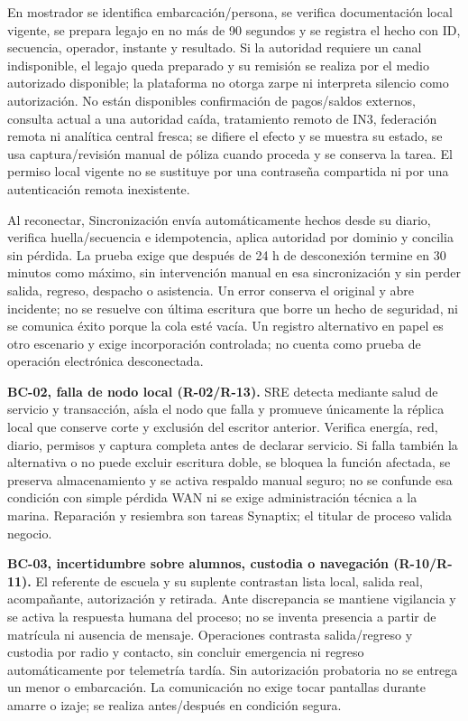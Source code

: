 En mostrador se identifica embarcación/persona, se verifica documentación local vigente, se prepara legajo en no más de 90 segundos y se registra el hecho con ID, secuencia, operador, instante y resultado. Si la autoridad requiere un canal indisponible, el legajo queda preparado y su remisión se realiza por el medio autorizado disponible; la plataforma no otorga zarpe ni interpreta silencio como autorización. No están disponibles confirmación de pagos/saldos externos, consulta actual a una autoridad caída, tratamiento remoto de IN3, federación remota ni analítica central fresca; se difiere el efecto y se muestra su estado, se usa captura/revisión manual de póliza cuando proceda y se conserva la tarea. El permiso local vigente no se sustituye por una contraseña compartida ni por una autenticación remota inexistente. \parencites[cap.~15, autonomía RT-03.10 y sincronización RT-03.13, p.~33; RT-09.01, p.~34; numeral~16.1, decisión~21, p.~38]{sd8-c07}[cap.~3, funciones no disponibles RT-03.13, p.~9]{sd8-bt}

Al reconectar, Sincronización envía automáticamente hechos desde su diario, verifica huella/secuencia e idempotencia, aplica autoridad por dominio y concilia sin pérdida. La prueba exige que después de 24 h de desconexión termine en 30 minutos como máximo, sin intervención manual en esa sincronización y sin perder salida, regreso, despacho o asistencia. Un error conserva el original y abre incidente; no se resuelve con última escritura que borre un hecho de seguridad, ni se comunica éxito porque la cola esté vacía. Un registro alternativo en papel es otro escenario y exige incorporación controlada; no cuenta como prueba de operación electrónica desconectada.

\textbf{BC-02, falla de nodo local (R-02/R-13).} SRE detecta mediante salud de servicio y transacción, aísla el nodo que falla y promueve únicamente la réplica local que conserve corte y exclusión del escritor anterior. Verifica energía, red, diario, permisos y captura completa antes de declarar servicio. Si falla también la alternativa o no puede excluir escritura doble, se bloquea la función afectada, se preserva almacenamiento y se activa respaldo manual seguro; no se confunde esa condición con simple pérdida WAN ni se exige administración técnica a la marina. Reparación y resiembra son tareas Synaptix; el titular de proceso valida negocio.

\textbf{BC-03, incertidumbre sobre alumnos, custodia o navegación (R-10/R-11).} El referente de escuela y su suplente contrastan lista local, salida real, acompañante, autorización y retirada. Ante discrepancia se mantiene vigilancia y se activa la respuesta humana del proceso; no se inventa presencia a partir de matrícula ni ausencia de mensaje. Operaciones contrasta salida/regreso y custodia por radio y contacto, sin concluir emergencia ni regreso automáticamente por telemetría tardía. Sin autorización probatoria no se entrega un menor o embarcación. La comunicación no exige tocar pantallas durante amarre o izaje; se realiza antes/después en condición segura.

